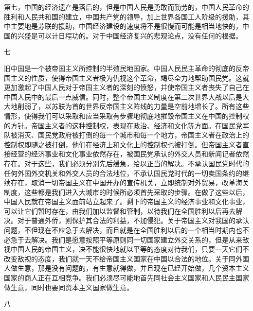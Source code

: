 \documentclass[UTF-8, a5paper, 12pt]{ctexart}
\begin{document}
第七，中国的经济遗产是落后的，但是中国人民是勇敢而勤劳的，中国人民革命的胜利和人民共和国的建立，中国共产党的领导，加上世界各国工人阶级的援助，其中主要地是苏联的援助，中国经济建设的速度将不是很慢而可能是相当地快的，中国的兴盛是可以计日程功的。对于中国经济复兴的悲观论点，没有任何的根据。

七

旧中国是一个被帝国主义所控制的半殖民地国家。中国人民民主革命的彻底的反帝国主义的性质，使得帝国主义者极为仇视这个革命，竭尽全力地帮助国民党。这就更加激起了中国人民对于帝国主义者的深刻的愤怒，并使帝国主义者丧失了自己在中国人民中的最后一点威信。同时，整个帝国主义制度在第二次世界大战以后是大大地削弱了，以苏联为首的世界反帝国主义阵线的力量是空前地增长了。所有这些情形，使得我们可以采取和应当采取有步骤地彻底地摧毁帝国主义在中国的控制权的方针。帝国主义者的这种控制权，表现在政治、经济和文化等方面。在国民党军队被消灭、国民党政府被打倒的每一个城市和每一个地方，帝国主义者在政治上的控制权即随之被打倒，他们在经济上和文化上的控制权也被打倒。但帝国主义者直接经营的经济事业和文化事业依然存在，被国民党承认的外交人员和新闻记者依然存在。对于这些，我们必须分别先后缓急，给以正当的解决。不承认国民党时代的任何外国外交机关和外交人员的合法地位，不承认国民党时代的一切卖国条约的继续存在，取消一切帝国主义在中国开办的宣传机关，立即统制对外贸易，改革海关制度，这些都是我们进入大城市的时候所必须首先采取的步骤。在做了这些以后，中国人民就在帝国主义面前站立起来了。剩下的帝国主义的经济事业和文化事业，可以让它们暂时存在，由我们加以监督和管制，以待我们在全国胜利以后再去解决。对于普通外侨，则保护其合法的利益，不加侵犯。关于帝国主义对我国的承认问题，不但现在不应急于去解决，而且就是在全国胜利以后的一个相当时期内也不必急于去解决。我们是愿意按照平等原则同一切国家建立外交关系的，但是从来敌视中国人民的帝国主义，决不能很快地就以平等的态度对待我们，只要一天它们不改变敌视的态度，我们就一天不给帝国主义国家在中国以合法的地位。关于同外国人做生意，那是没有问题的，有生意就得做，并且现在已经开始做，几个资本主义国家的商人正在互相竞争。我们必须尽可能地首先同社会主义国家和人民民主国家做生意，同时也要同资本主义国家做生意。

八
\end{document}
